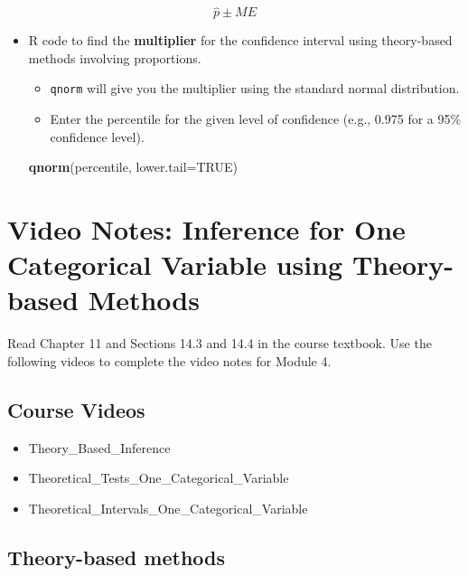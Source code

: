 \documentclass[
]{report}
\newenvironment{Shaded}{\begin{snugshade}}{\end{snugshade}}
\newcommand{\AttributeTok}[1]{\textcolor[rgb]{0.13,0.29,0.53}{#1}}
\newcommand{\ConstantTok}[1]{\textcolor[rgb]{0.56,0.35,0.01}{#1}}
\newcommand{\FunctionTok}[1]{\textcolor[rgb]{0.13,0.29,0.53}{\textbf{#1}}}
\newcommand{\NormalTok}[1]{#1}
\begin{document}
\[\hat{p} \pm ME\]

\begin{itemize}
\item
  R code to find the \textbf{multiplier} for the confidence interval using theory-based methods involving proportions.

  \begin{itemize}
  \item
    \texttt{qnorm} will give you the multiplier using the standard normal distribution.
  \item
    Enter the percentile for the given level of confidence (e.g., 0.975 for a 95\% confidence level).
  \end{itemize}

\begin{Shaded}
\begin{Highlighting}[]
\FunctionTok{qnorm}\NormalTok{(percentile, }\AttributeTok{lower.tail=}\ConstantTok{TRUE}\NormalTok{)}
\end{Highlighting}
\end{Shaded}
\end{itemize}

\newpage

\section{Video Notes: Inference for One Categorical Variable using Theory-based Methods}\label{video-notes-inference-for-one-categorical-variable-using-theory-based-methods}

Read Chapter 11 and Sections 14.3 and 14.4 in the course textbook. Use the following videos to complete the video notes for Module 4.

\subsection{Course Videos}\label{course-videos-3}

\begin{itemize}
\item
  Theory\_Based\_Inference
\item
  Theoretical\_Tests\_One\_Categorical\_Variable
\item
  Theoretical\_Intervals\_One\_Categorical\_Variable
\end{itemize}


\subsection*{Theory-based methods}\label{theory-based-methods}
\end{document}
